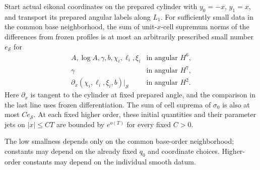 \begin{proposition}
\label{in:entry}
Start actual eikonal coordinates on the prepared cylinder with
$y_0=-x$, $y_1=x$, and transport its prepared angular labels along
$L_1$. For sufficiently small data in the common base neighborhood,
the sum of unit-$x$-cell supremum norms of the differences from frozen
profiles is at most an arbitrarily prescribed small number
$e_{\mathcal S}$ for
\begin{equation}\label{in:entry-orders}
\begin{array}{ll}
 A,\log A,\gamma,b,\chi_i,\ell_i,\xi_i
     &\text{in angular }H^6,\\
 \gamma&\text{in angular }H^7,\\
 \partial_x(\chi_i,\ell_i,\xi_i,b)|_{\mathcal S}
     &\text{in angular }H^2.
\end{array}
\end{equation}
Here $\partial_x$ is tangent to the cylinder at fixed prepared angle,
and the comparison in the last line uses frozen differentiation.
The sum of cell suprema of $\sigma_0$ is also at most
$C e_{\mathcal S}$. At each fixed higher order, these initial
quantities and their parameter jets on $|x|\le CT$ are bounded by
$e^{o(T)}$ for every fixed $C>0$.

The low smallness depends only on the common base-order neighborhood;
constants may depend on the already fixed $q_0$ and coordinate choices.
Higher-order constants may depend on the individual smooth datum.
\end{proposition}

